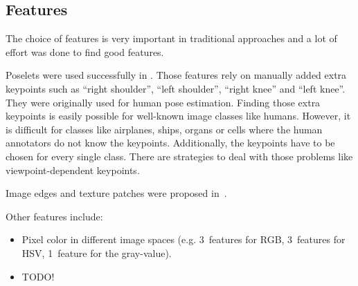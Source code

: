 
\subsection{Features}\label{subsec:features}%
The choice of features is very important in traditional approaches and a lot
of effort was done to find good features.

Poselets were used successfully in \cite{bourdev2010detecting,brox2011object}.
Those features rely on manually added extra keypoints such as \enquote{right
shoulder}, \enquote{left shoulder}, \enquote{right knee} and \enquote{left
knee}. They were originally used for human pose estimation. Finding those extra
keypoints is easily possible for well-known image classes like humans. However,
it is difficult for classes like airplanes, ships, organs or cells where the
human annotators do not know the keypoints. Additionally, the keypoints have to
be chosen for every single class. There are strategies to deal with those
problems like viewpoint-dependent keypoints.

Image edges and texture patches were proposed in~\cite{brox2011object}.

Other features include:

\begin{itemize}
    \item Pixel color in different image spaces (e.g. 3~features for RGB,
          3~features for HSV, 1~feature for the gray-value).
    \item TODO!
\end{itemize}
